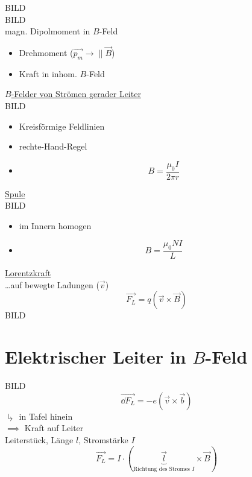 \begin{rep*}[ note = Magnetfelder ]
	BILD \\
	BILD \\
	magn. Dipolmoment in $B$-Feld
	\begin{itemize}[ label = $\rightarrow$ ]
		\item Drehmoment ($\vec{p_m} \rightarrow \parallel \vec{B}$)
		\item Kraft in inhom. $B$-Feld
	\end{itemize}
	
	\uline{$B$-Felder von Strömen gerader Leiter} \\
	BILD \\
	\begin{itemize}
		\item Kreisförmige Feldlinien
		\item rechte-Hand-Regel
		\item \[ \boxed{ B = \frac{\mu_0 I}{2 \pi r} } \]
	\end{itemize}
	
	\uline{Spule} \\
	BILD \\
	\begin{itemize}
		\item im Innern homogen
		\item \[ \boxed{ B = \frac{\mu_0 N I}{L} } \]
	\end{itemize}
	
	\uline{Lorentzkraft} \\
	\dots auf bewegte Ladungen ($\vec{v}$)
	\[ \boxed{ \vec{F_L} = q ( \vec{v} \times \vec{B} ) } \]
	BILD
\end{rep*}

\section{Elektrischer Leiter in \texorpdfstring{$B$}{B}-Feld}
BILD \\
\[ \vec{\dd F_L} = -e ( \vec{v} \times \vec{b} ) \]
$\drsh$ in Tafel hinein \\
$\implies$ Kraft auf Leiter \\
Leiterstück, Länge $l$, Stromstärke $I$
\[ \boxed{ \vec{F_L} = I \cdot ( \underbrace{\vec{l}}_{\text{Richtung des Stromes } I} \times \vec{B} ) } \]

